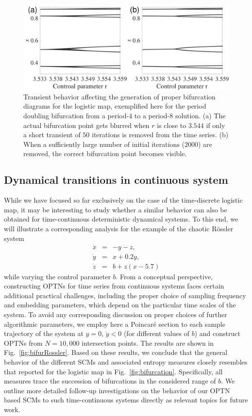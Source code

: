 \documentclass[aip,cha,reprint,nofootinbib]{revtex4-1}
\begin{document}
\begin{figure}
	\centering
	\includegraphics[width=\columnwidth]{period4_exampleTransients.pdf}
\caption{\small{Transient behavior affecting the generation of proper bifurcation diagrams for the logistic map, exemplified here for the period doubling bifurcation from a period-4 to a period-8 solution. (a) The actual bifurcation point gets blurred when $r$ is close to $3.544$ if only a short transient of $50$ iterations is removed from the time series. (b) When a sufficiently large number of initial iterations ($2000$) are removed, the correct bifurcation point becomes visible. }\label{fig:transient}}
\end{figure}

\subsection{Dynamical transitions in continuous system}\label{sec:cont}

While we have focused so far exclusively on the case of the time-discrete logistic map, it may be interesting to study whether a similar behavior can also be obtained for time-continuous deterministic dynamical systems. To this end, we will illustrate a corresponding analysis for the example of the chaotic R\"ossler system \cite{Roessler1976} 
\begin{eqnarray}
\dot{x} &=& -y-z, \nonumber \\
\dot{y} &=& x+0.2y, \\
\dot{z} &=& b+z(x-5.7) \nonumber
\end{eqnarray}
while varying the control parameter $b$. From a conceptual perspective, constructing OPTNs for time series from continuous systems faces certain additional practical challenges, including the proper choice of sampling frequency and embedding parameters, which depend on the particular time scales of the system. To avoid any corresponding discussion on proper choices of further algorithmic parameters, we employ here a Poincar\'e section to each sample trajectory of the system at $y=0$, $\dot{y}<0$ (for different values of $b$) and construct OPTNs from $N = 10,000$ intersection points. The results are shown in Fig.~\ref{fig:bifurRossler}. Based on these results, we conclude that the general behavior of the different SCMs and associated entropy measures closely resembles that reported for the logistic map in Fig.~\ref{fig:bifurcation}. Specifically, all measures trace the succession of bifurcations in the considered range of $b$. We outline more detailed follow-up investigations on the behavior of our OPTN based SCMs to such time-continuous systems directly as relevant topics for future work.
\end{document}

